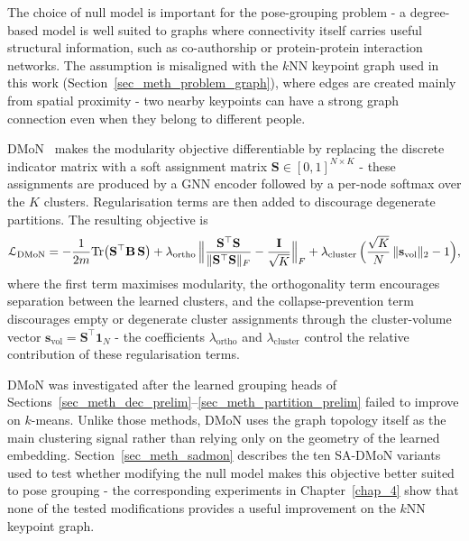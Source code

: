 The choice of null model is important for the pose-grouping problem -
a degree-based model is well suited to graphs where connectivity itself carries useful structural information,
such as co-authorship or protein-protein interaction networks.
The assumption is misaligned with the $k$NN keypoint graph used in this work (Section~\ref{sec_meth_problem_graph}),
where edges are created mainly from spatial proximity -
two nearby keypoints can have a strong graph connection even when they belong to different people.

DMoN~\cite{tsitsulin2023dmon} makes the modularity objective differentiable
by replacing the discrete indicator matrix with a soft assignment matrix $\mathbf{S} \in [0,1]^{N \times K}$ -
these assignments are produced by a GNN encoder followed by a per-node softmax over the $K$ clusters.
Regularisation terms are then added to discourage degenerate partitions.
The resulting objective is
\begin{equation}
    \mathcal{L}_{\text{DMoN}}
    = -\frac{1}{2m}
      \mathrm{Tr}\bigl(\mathbf{S}^{\top} \mathbf{B}\,\mathbf{S}\bigr)
      + \lambda_{\text{ortho}}\,
      \Bigl\|
      \frac{\mathbf{S}^{\top}\mathbf{S}}
           {\|\mathbf{S}^{\top}\mathbf{S}\|_F}
      - \frac{\mathbf{I}}{\sqrt{K}}
      \Bigr\|_F
      + \lambda_{\text{cluster}}\,
      \Bigl(
      \frac{\sqrt{K}}{N}\,
      \|\mathbf{s}_{\text{vol}}\|_2
      - 1
      \Bigr),
    \label{eq:dmon_loss_prelim}
\end{equation}
where the first term maximises modularity,
the orthogonality term encourages separation between the learned clusters,
and the collapse-prevention term discourages empty or degenerate cluster assignments
through the cluster-volume vector $\mathbf{s}_{\text{vol}} = \mathbf{S}^{\top}\mathbf{1}_N$ -
the coefficients $\lambda_{\text{ortho}}$ and $\lambda_{\text{cluster}}$
control the relative contribution of these regularisation terms.

DMoN was investigated
after the learned grouping heads of Sections~\ref{sec_meth_dec_prelim}--\ref{sec_meth_partition_prelim}
failed to improve on $k$-means.
Unlike those methods,
DMoN uses the graph topology itself as the main clustering signal
rather than relying only on the geometry of the learned embedding.
Section~\ref{sec_meth_sadmon} describes the ten SA-DMoN variants
used to test whether modifying the null model makes this objective better suited to pose grouping -
the corresponding experiments in Chapter~\ref{chap_4}
show that none of the tested modifications provides a useful improvement on the $k$NN keypoint graph.
